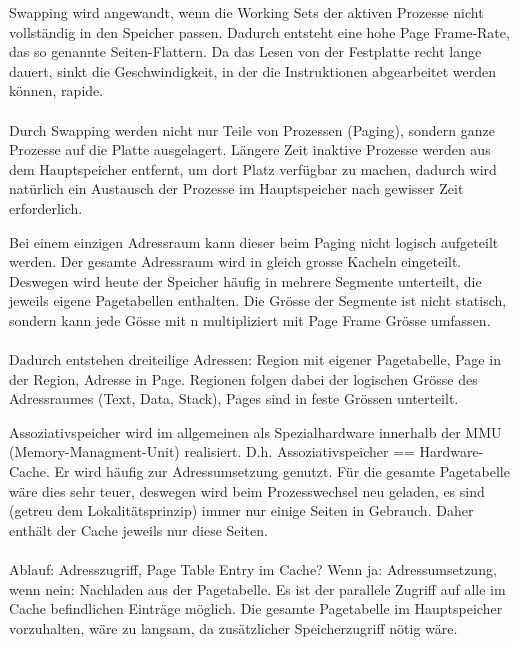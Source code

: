 \begin{answer}
Swapping wird angewandt, wenn die Working Sets der aktiven Prozesse nicht vollständig in den Speicher passen. Dadurch entsteht eine hohe Page Frame-Rate, das so genannte Seiten-Flattern. Da das Lesen von der Festplatte recht lange dauert, sinkt die Geschwindigkeit, in der die Instruktionen abgearbeitet werden können, rapide.

\paragraph*{}
Durch Swapping werden nicht nur Teile von Prozessen (Paging), sondern ganze Prozesse auf die Platte ausgelagert. Längere Zeit inaktive Prozesse werden aus dem Hauptspeicher entfernt, um dort Platz verfügbar zu machen, dadurch wird natürlich ein Austausch der Prozesse im Hauptspeicher nach gewisser Zeit erforderlich.
\end{answer}

\begin{answer}
Bei einem einzigen Adressraum kann dieser beim Paging nicht logisch aufgeteilt werden. Der gesamte Adressraum wird in gleich grosse Kacheln eingeteilt.
Deswegen wird heute der Speicher häufig in mehrere Segmente unterteilt, die jeweils eigene Pagetabellen enthalten. Die Grösse der Segmente ist nicht statisch, sondern kann jede Gösse mit n multipliziert mit Page Frame Grösse umfassen.

\paragraph*{}
Dadurch entstehen dreiteilige Adressen:
Region mit eigener Pagetabelle, Page in der Region, Adresse in Page.
Regionen folgen dabei der logischen Grösse des Adressraumes (Text, Data, Stack), Pages sind in feste Grössen unterteilt.
\end{answer}

\begin{answer}
Assoziativspeicher wird im allgemeinen als Spezialhardware innerhalb der MMU (Memory-Managment-Unit) realisiert. D.h. Assoziativspeicher == Hardware-Cache.
Er wird häufig zur Adressumsetzung genutzt. Für die gesamte Pagetabelle wäre dies sehr teuer, deswegen wird beim Prozesswechsel neu geladen, es sind (getreu dem Lokalitätsprinzip) immer nur einige Seiten in Gebrauch. Daher enthält der Cache jeweils nur diese Seiten.

\paragraph*{}
Ablauf: Adresszugriff,
Page Table Entry im Cache? Wenn ja: Adressumsetzung, wenn nein: Nachladen aus der Pagetabelle.
Es ist der parallele Zugriff auf alle im Cache befindlichen Einträge möglich. Die gesamte Pagetabelle im Hauptspeicher vorzuhalten, wäre zu langsam, da zusätzlicher Speicherzugriff nötig wäre.
\end{answer}

